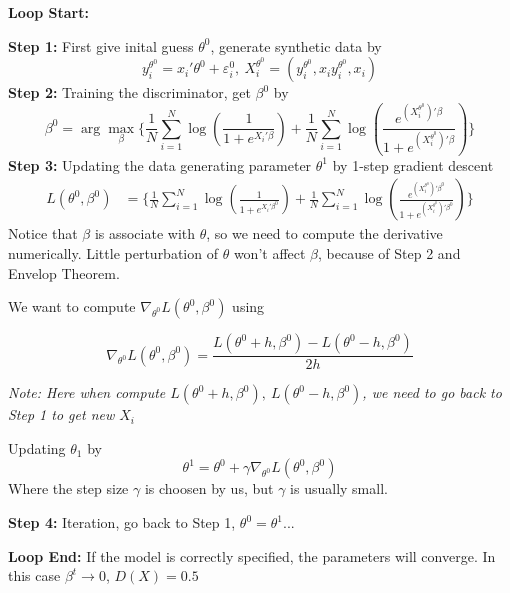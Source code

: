\documentclass[11pt]{article}
\begin{document}
\textbf{Loop Start:}

\textbf{Step 1:} First give inital guess $\theta^0$, generate synthetic data by
$$y_i^{\theta^0}=x_i'\theta^0+\varepsilon^0_i,\ X_i^{\theta^0} = (y_i^{\theta^0},x_iy_i^{\theta^0},x_i)$$
\textbf{Step 2:} Training the discriminator, get $\beta^0$ by 
$$\beta^0 = \arg\max_\beta \bigg\{\frac{1}{N}\sum_{i=1}^N\log(\frac{1}{1+e^{X_i'\beta}})+\frac{1}{N}\sum_{i=1}^N\log(\frac{e^{(X_i^{\theta^0})'\beta}}{1+e^{(X_i^{\theta^0})'\beta}})\bigg\}$$
\textbf{Step 3:} Updating the data generating parameter $\theta^1$ by 1-step gradient descent
\begin{align*}
	L(\theta^0,\beta^0)&= \bigg\{\frac{1}{N}\sum_{i=1}^N\log(\frac{1}{1+e^{X_i'\beta^0}})+\frac{1}{N}\sum_{i=1}^N\log(\frac{e^{(X_i^{\theta^0})'\beta^0}}{1+e^{(X_i^{\theta^0})'\beta^0}})\bigg\}
\end{align*}
Notice that $\beta$ is associate with $\theta$, so we need to compute the derivative numerically. Little perturbation of $\theta$ won't affect $\beta$, because of Step 2 and Envelop Theorem.

We want to compute $\nabla_{\theta^0} L(\theta^0,\beta^0)$ using 

$$\nabla_{\theta^0} L(\theta^0,\beta^0)=\frac{L(\theta^0+h,\beta^0)-L(\theta^0-h,\beta^0)}{2h}$$

\textit{Note: Here when compute $L(\theta^0+h,\beta^0),\ L(\theta^0-h,\beta^0)$, we need to go back to Step 1 to get new $X_i$}

Updating $\theta_1$ by 
$$\theta^1 = \theta^0+\gamma \nabla_{\theta^0} L(\theta^0,\beta^0)$$
Where the step size $\gamma$ is choosen by us, but $\gamma$ is usually small.

\textbf{Step 4:} Iteration, go back to Step 1, $\theta^0=\theta^1$...
\bigskip

\textbf{Loop End:} If the model is correctly specified, the parameters will converge. In this case $\beta^t\to 0$, $D(X) = 0.5$
\end{document}
